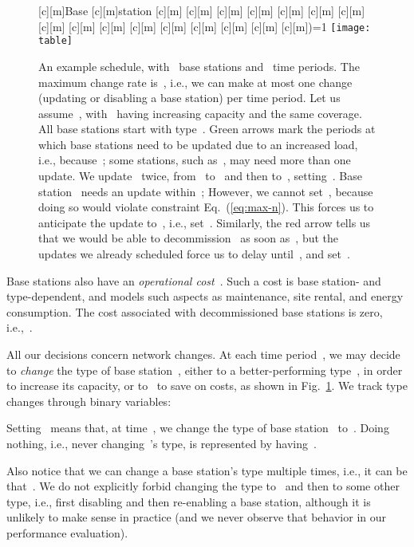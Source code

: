 \documentclass[10pt,journal,cspaper,compsoc]{IEEEtran}
\newcommand{\Fig}[1]{Fig.~\ref{fig:#1}}
\newcommand{\Eq}[1]{Eq.~(\ref{eq:#1})}
\begin{document}
\begin{figure}[t!]
[c][m]{Base}
[c][m]{station}
[c][m]{}
[c][m]{}
[c][m]{}
[c][m]{}
[c][m]{}
[c][m]{}
[c][m]{}
[c][m]{}
[c][m]{\footnotesize{}}
[c][m]{\footnotesize{}}
[c][m]{\footnotesize{}}
[c][m]{\footnotesize{}}
[c][m]{\footnotesize{}}
[c][m]{\footnotesize{}}
[c][m]{\footnotesize{}}
[c][m]{\footnotesize{)=1}}
\centering
	\texttt{[image: table]}
	\caption{
	An example schedule, with~ base stations and~ time periods. The maximum change rate is~,
	i.e., we can make at most one change (updating or disabling a base station) per time period.
	Let us assume~, with~ having increasing capacity and the
	same coverage. All base stations start with type~.
	Green arrows mark the periods at which base stations need to be updated due to an increased load, i.e., because~;
	some stations, such as~, may need more than one update.
	We update~ twice, from~ to~ and then to~, setting~.
	Base station~ needs an update within~; However, we cannot set~, because doing so
	would violate constraint \Eq{max-n}. This forces us to anticipate the update to~, i.e., set~. 
	Similarly, the red arrow tells us that we would be able to decommission~ as soon as~,
	but the updates we already scheduled force us to delay until~, and set~.
	\label{fig:table}
	}
\end{figure}

Base stations also have an {\em operational cost}~. Such a cost is base station- and type-dependent, and models such aspects as maintenance, site rental, and energy consumption.
The cost associated with decommissioned base stations is zero, i.e.,~.

All our decisions concern network changes.
At each time period~, we may decide to {\em change} the type of base station~, either to a better-performing
type~, in order to increase its capacity, or to~ to save on costs, as shown in \Fig{table}.
We track type changes through binary variables:

Setting~ means that, at time~, we change the type of base station~ to~.
Doing nothing, i.e., never changing~'s type, is represented by having~.

Also notice that we can change a base station's type multiple times, i.e., it can be\\
that~. We do not explicitly forbid changing the type to~ and then to
some other type, i.e., first disabling and then re-enabling a base station, although it is unlikely to make sense
in practice (and we never observe that behavior in our performance evaluation).
\end{document}
